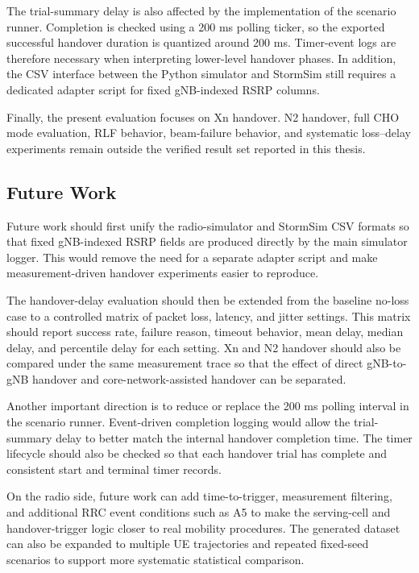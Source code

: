 The trial-summary delay is also affected by the implementation of the scenario runner. Completion is checked using a 200 ms polling ticker, so the exported successful handover duration is quantized around 200 ms. Timer-event logs are therefore necessary when interpreting lower-level handover phases. In addition, the CSV interface between the Python simulator and StormSim still requires a dedicated adapter script for fixed gNB-indexed RSRP columns.

Finally, the present evaluation focuses on Xn handover. N2 handover, full CHO mode evaluation, RLF behavior, beam-failure behavior, and systematic loss--delay experiments remain outside the verified result set reported in this thesis.

\subsection{Future Work}

Future work should first unify the radio-simulator and StormSim CSV formats so that fixed gNB-indexed RSRP fields are produced directly by the main simulator logger. This would remove the need for a separate adapter script and make measurement-driven handover experiments easier to reproduce.

The handover-delay evaluation should then be extended from the baseline no-loss case to a controlled matrix of packet loss, latency, and jitter settings. This matrix should report success rate, failure reason, timeout behavior, mean delay, median delay, and percentile delay for each setting. Xn and N2 handover should also be compared under the same measurement trace so that the effect of direct gNB-to-gNB handover and core-network-assisted handover can be separated.

Another important direction is to reduce or replace the 200 ms polling interval in the scenario runner. Event-driven completion logging would allow the trial-summary delay to better match the internal handover completion time. The timer lifecycle should also be checked so that each handover trial has complete and consistent start and terminal timer records.

On the radio side, future work can add time-to-trigger, measurement filtering, and additional RRC event conditions such as A5 to make the serving-cell and handover-trigger logic closer to real mobility procedures. The generated dataset can also be expanded to multiple UE trajectories and repeated fixed-seed scenarios to support more systematic statistical comparison.

